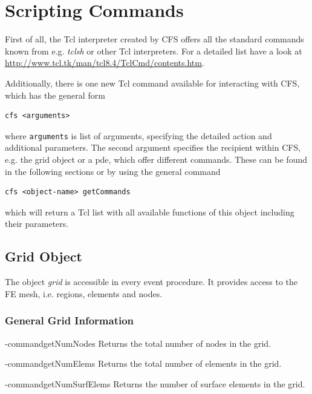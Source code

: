 \chapter{Scripting Commands}
First of all, the Tcl interpreter created by CFS offers all the
standard commands known from e.g. {\em tclsh} or other Tcl
interpreters. For a detailed list have a look at
\url{http://www.tcl.tk/man/tcl8.4/TclCmd/contents.htm}.

Additionally, there is one new Tcl command available for interacting with
CFS, which has the general form
\begin{verbatim}
cfs <arguments>
\end{verbatim}
where \verb#arguments# is list of arguments, specifying the detailed
action and additional parameters. The second argument specifies the
recipient within CFS, e.g. the grid object or a pde, which offer
different commands. These can be found in the following sections or by
using the general command
\begin{verbatim}
cfs <object-name> getCommands
\end{verbatim}
which will return a Tcl list with all available functions of this
object including their parameters.

\section{Grid Object}
The object {\em grid} is accessible in every event procedure. It
provides access to the FE mesh, i.e. regions, elements and nodes.

\subsection{General Grid Information}

\tcl-command{getNumNodes}
Returns the total number of nodes in the grid.
\begin{tcl-params}
  \returnlist
\end{tcl-params}

\tcl-command{getNumElems}
Returns the total number of elements in the grid.
\begin{tcl-params}
  \returnlist
\end{tcl-params}

\tcl-command{getNumSurfElems}
Returns the number of surface elements in the grid.
\begin{tcl-params}
  \returnlist
\end{tcl-params}

